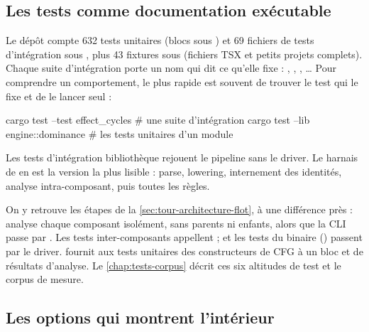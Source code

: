 \subsection{Les tests comme documentation exécutable}

Le dépôt compte 632 tests unitaires (blocs  sous ) et 69 fichiers de tests d'intégration sous , plus 43 fixtures sous  (fichiers TSX et petits projets complets). Chaque suite d'intégration porte un nom qui dit ce qu'elle fixe : , , , \ldots{} Pour comprendre un comportement, le plus rapide est souvent de trouver le test qui le fixe et de le lancer seul :

\begin{shell}
cargo test --test effect_cycles            # une suite d'intégration
cargo test --lib engine::dominance         # les tests unitaires d'un module
\end{shell}

Les tests d'intégration \og bibliothèque\fg{} rejouent le pipeline sans le driver. Le harnais de  en est la version la plus lisible : parse, lowering, internement des identités, analyse intra-composant, puis toutes les règles.


On y retrouve les étapes de la \cref{sec:tour-architecture-flot}, à une différence près :  analyse chaque composant isolément, sans parents ni enfants, alors que la CLI passe par . Les tests inter-composants appellent  ;  et les tests du binaire () passent par le driver.  fournit aux tests unitaires des constructeurs de CFG à un bloc et de résultats d'analyse. Le \cref{chap:tests-corpus} décrit ces six altitudes de test et le corpus de mesure.

\subsection{Les options qui montrent l'intérieur}

